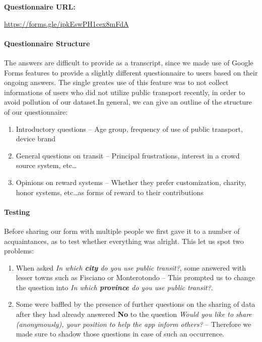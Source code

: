 \documentclass[a4paper, 11pt]{report}
\newenvironment{inlinebox}[1][]{%
  \titlebox%
  {\upshape\bfseries #1}%
}{%
  \endbasecolorbox%
}
\begin{document}
\begin{center}
	\begin{inlinebox}[Questionnaire URL:]
		\centering
		\url{https://forms.gle/ipkEswPH1cex8mFdA}
	\end{inlinebox}
\end{center}
\paragraph{Questionnaire Structure}

The answers are difficult to provide as a transcript, since we made use of Google Forms
features to provide a slightly different questionnaire to users based on their ongoing answers.
The single greates use of this feature was to not collect informations of users who did not
utilize public transport recently, in order to avoid pollution of our dataset.\@ In
general, we can give an outline of the structure of our questionnaire:

\begin{enumerate}
	\item Introductory questions -- Age group, frequency of use of public transport, device brand
	\item General questions on transit -- Principal frustrations, interest in a crowd source system, etc\dots
	\item Opinions on reward systems -- Whether they prefer customization, charity, honor systems, etc\dots\@ as
	      forms of reward to their contributions
\end{enumerate}

\paragraph{Testing}
Before sharing our form with multiple people we first gave it to a number of acquaintances,
as to test whether everything was alright. This let us spot two problems:
\begin{enumerate}
	\item When asked \emph{In which \textbf{city} do you use public transit?}, some answered
	      with lesser towns such as Fisciano or Monterotondo -- This prompted us to change the
	      question into \emph{In which \textbf{province} do you use public transit?}.
	\item Some were baffled by the presence of further questions on the sharing of data after
	      they had already answered \textbf{No} to the question \emph{Would you like to share
		      (anonymously), your position to help the app inform others?} -- Therefore we made sure to
	      shadow those questions in case of such an occurrence.
\end{enumerate}
\end{document}
